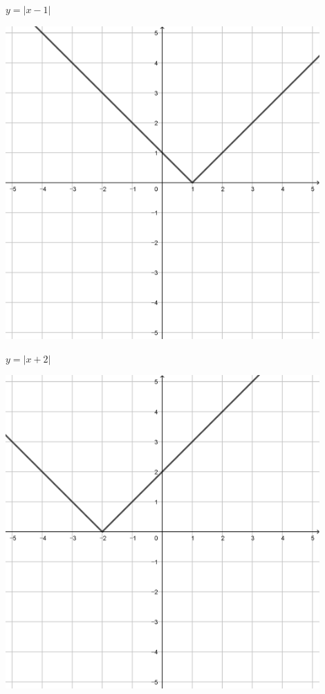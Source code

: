\documentclass[a4paper]{oblivoir}
\begin{document}
\clearpage
\begin{minipage}{0.45\textwidth}\centering
\(y=|x-1|\)
\par\bigskip\includegraphics[width=0.9\textwidth]{img/3_piecewise_19}
\end{minipage}
\begin{minipage}{0.45\textwidth}\centering
\(y=|x+2|\)
\par\bigskip\includegraphics[width=0.9\textwidth]{img/3_piecewise_20}
\end{minipage}\bigskip\bigskip\par
\end{document}
